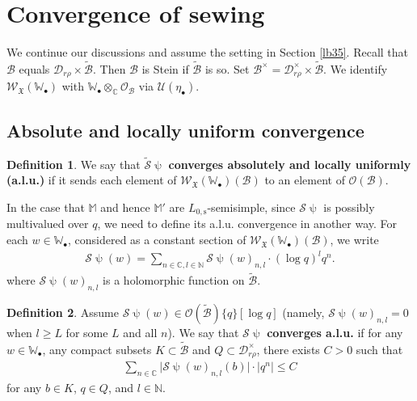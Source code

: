 \documentclass[12pt,a4paper,notitlepage]{article}
\theoremstyle{definition}
\newtheorem{df}{Definition}[section]
\theoremstyle{plain}
\newcommand{\fk}{\mathfrak}
\newcommand{\mc}{\mathcal}
\newcommand{\wtd}{\widetilde}
\newcommand{\scr}{\mathscr}
\newcommand{\blt}{\bullet}
\newcommand{\Wbb}{\mathbb W}
\newcommand{\Mbb}{\mathbb M}
\newcommand{\Cbb}{\mathbb C}
\newcommand{\Nbb}{\mathbb N}
\newcommand{\Lss}{L_{0,\mathrm{s}}}
\numberwithin{equation}{section}
\begin{document}
\section{Convergence of sewing}\label{lb52}




We continue our discussions and assume the setting in Section \ref{lb35}. Recall that $\mc B$ equals $\mc D_{r\rho}\times\wtd{\mc B}$. Then $\mc B$ is Stein if  $\wtd{\mc B}$ is so. Set $\mc B^\times=\mc D_{r\rho}^\times\times\wtd{\mc B}$. \index{B@$\mc B^\times$} We identify $\scr W_{\fk X}(\Wbb_\blt)$ with $\Wbb_\blt\otimes_\Cbb\scr O_{\mc B}$ via $\mc U(\eta_\blt)$.



\subsection*{Absolute and locally uniform convergence}



\begin{df}
We say that $\wtd{\mc S}\uppsi$  \textbf{converges absolutely and locally uniformly (a.l.u.)} if it sends each element of $\scr W_{\fk X}(\Wbb_\blt)(\mc B)$ to an element of $\scr O(\mc B)$. 
\end{df}







In the case that $\Mbb$ and hence $\Mbb'$ are $\Lss$-semisimple, since $\mc S\uppsi$ is possibly multivalued over $q$, we need to define its a.l.u. convergence in another way. For each $w\in \Wbb_\blt$, considered as a constant section of $\scr W_{\fk X}(\Wbb_\blt)(\mc B)$, we write
\begin{align*}
\mc S\uppsi(w)=\sum_{n\in \Cbb,l\in\Nbb}\mc S\uppsi(w)_{n,l}\cdot (\log q)^lq^n.
\end{align*}
where  $\mc S\uppsi(w)_{n,l}$ is a holomorphic function on $\wtd{\mc B}$. 


\begin{df}\label{lb37}
Assume $\mc S\uppsi(w)\in\scr O(\wtd{\mc B})\{q\}[\log q]$ (namely, $\mc S\uppsi(w)_{n,l}=0$ when $l\geq L$ for some $L$ and all $n$). We say that $\mc S\uppsi$ \textbf{converges a.l.u.} if  for any $w\in\Wbb_\blt$, any compact subsets $K\subset\wtd{\mc B}$ and $Q\subset\mc D_{r\rho}^\times$,  there exists $C>0$ such that
\begin{align}
	\sum_{n\in\Cbb}\big|\mc S\uppsi(w)_{n,l}(b)\big|\cdot |q^{n}|\leq C
\end{align}
for any $b\in K$, $q\in Q$, and $l\in\Nbb$. 
\end{df} 
\end{document}
